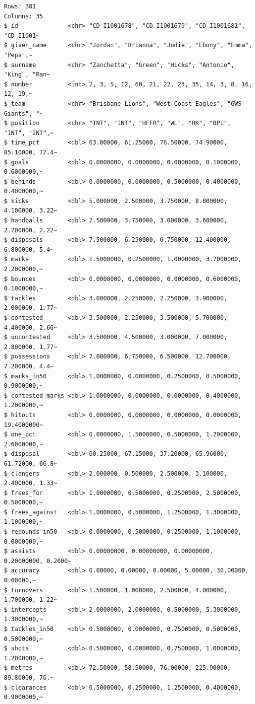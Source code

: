\documentclass[
  letterpaper,
]{book}
\begin{document}
\begin{verbatim}
Rows: 381
Columns: 35
$ id              <chr> "CD_I1001678", "CD_I1001679", "CD_I1001681", "CD_I1001~
$ given_name      <chr> "Jordan", "Brianna", "Jodie", "Ebony", "Emma", "Pepa",~
$ surname         <chr> "Zanchetta", "Green", "Hicks", "Antonio", "King", "Ran~
$ number          <int> 2, 3, 5, 12, 60, 21, 22, 23, 35, 14, 3, 8, 16, 12, 19,~
$ team            <chr> "Brisbane Lions", "West Coast Eagles", "GWS Giants", "~
$ position        <chr> "INT", "INT", "HFFR", "WL", "RK", "BPL", "INT", "INT",~
$ time_pct        <dbl> 63.00000, 61.25000, 76.50000, 74.90000, 85.10000, 77.4~
$ goals           <dbl> 0.0000000, 0.0000000, 0.0000000, 0.1000000, 0.6000000,~
$ behinds         <dbl> 0.0000000, 0.0000000, 0.5000000, 0.4000000, 0.4000000,~
$ kicks           <dbl> 5.000000, 2.500000, 3.750000, 8.800000, 4.100000, 3.22~
$ handballs       <dbl> 2.500000, 3.750000, 3.000000, 3.600000, 2.700000, 2.22~
$ disposals       <dbl> 7.500000, 6.250000, 6.750000, 12.400000, 6.800000, 5.4~
$ marks           <dbl> 1.5000000, 0.2500000, 1.0000000, 3.7000000, 2.2000000,~
$ bounces         <dbl> 0.0000000, 0.0000000, 0.0000000, 0.6000000, 0.1000000,~
$ tackles         <dbl> 3.000000, 2.250000, 2.250000, 3.900000, 2.000000, 1.77~
$ contested       <dbl> 3.500000, 2.250000, 3.500000, 5.700000, 4.400000, 2.66~
$ uncontested     <dbl> 3.500000, 4.500000, 3.000000, 7.000000, 2.800000, 1.77~
$ possessions     <dbl> 7.000000, 6.750000, 6.500000, 12.700000, 7.200000, 4.4~
$ marks_in50      <dbl> 1.0000000, 0.0000000, 0.2500000, 0.5000000, 0.9000000,~
$ contested_marks <dbl> 1.0000000, 0.0000000, 0.0000000, 0.4000000, 1.2000000,~
$ hitouts         <dbl> 0.0000000, 0.0000000, 0.0000000, 0.0000000, 19.4000000~
$ one_pct         <dbl> 0.0000000, 1.5000000, 0.5000000, 1.2000000, 2.6000000,~
$ disposal        <dbl> 60.25000, 67.15000, 37.20000, 65.96000, 61.72000, 66.8~
$ clangers        <dbl> 2.000000, 0.500000, 2.500000, 3.100000, 2.400000, 1.33~
$ frees_for       <dbl> 1.0000000, 0.5000000, 0.2500000, 2.5000000, 0.5000000,~
$ frees_against   <dbl> 1.0000000, 0.5000000, 1.2500000, 1.3000000, 1.1000000,~
$ rebounds_in50   <dbl> 0.0000000, 0.5000000, 0.2500000, 1.1000000, 0.0000000,~
$ assists         <dbl> 0.00000000, 0.00000000, 0.00000000, 0.20000000, 0.2000~
$ accuracy        <dbl> 0.00000, 0.00000, 0.00000, 5.00000, 30.00000, 0.00000,~
$ turnovers       <dbl> 1.500000, 1.000000, 2.500000, 4.000000, 1.700000, 1.22~
$ intercepts      <dbl> 2.0000000, 2.0000000, 0.5000000, 5.3000000, 1.3000000,~
$ tackles_in50    <dbl> 0.5000000, 0.0000000, 0.7500000, 0.5000000, 0.5000000,~
$ shots           <dbl> 0.5000000, 0.0000000, 0.7500000, 1.0000000, 1.2000000,~
$ metres          <dbl> 72.50000, 58.50000, 76.00000, 225.90000, 89.80000, 76.~
$ clearances      <dbl> 0.5000000, 0.2500000, 1.2500000, 0.4000000, 0.9000000,~
\end{verbatim}
\end{document}
